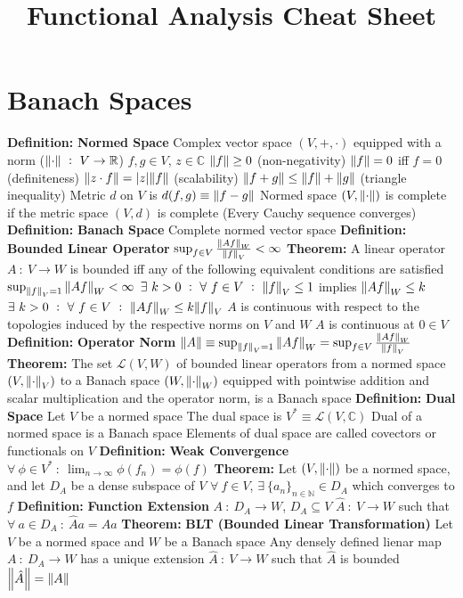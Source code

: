 \documentclass[14pt]{extarticle}
\title{Functional Analysis Cheat Sheet}
\def\Definition{{\color{blue} \textbf{Definition:} }}
\def\Theorem{{\color{red} \textbf{Theorem:} }}
\begin{document}
	\maketitle
	
	\section*{Banach Spaces}
	\begin{outline}		
		\1	\Definition \textbf{Normed Space}
			\2	Complex vector space $(V,+,\cdot)$ equipped with a norm
					($\norm{\cdot}~:~V \rightarrow \mathbb{R}$)
				\3	$f,g \in V$, $z \in \mathbb{C}$	
				\3	$\norm{f} \ge 0$ (non-negativity)
				\3	$\norm{f} = 0$ iff $f = 0$ (definiteness)
				\3	$\norm{z \cdot f} = \abs{z}\norm{f}$ (scalability)
				\3	$\norm{f + g} \le \norm{f} + \norm{g}$ (triangle inequality)
			\2	Metric $d$ on $V$ is $d(f,g) \equiv \norm{f - g}$
			\2	Normed space $(V,\norm{\cdot})$ is complete if the metric space
					$(V,d)$ is complete (Every Cauchy sequence converges)
		\1	\Definition \textbf{Banach Space}
			\2	Complete normed vector space
		\1	\Definition \textbf{Bounded Linear Operator}
			\2	$\sup_{f \in V} \frac{\norm{Af}_W}{\norm{f}_V} < \infty$
		\1	\Theorem A linear operator $A~:~V \rightarrow W$ is bounded iff any of
				the following equivalent conditions are satisfied
			\2	$\sup_{\norm{f}_V = 1}\norm{Af}_W < \infty$
			\2	$\exists~k > 0~:~\forall~f \in V~:~\norm{f}_V \le 1$ implies $\norm{Af}_W \le k$
			\2	$\exists~k > 0~:~\forall~f \in V~:~\norm{Af}_W \le k\norm{f}_V$
			\2	$A$ is continuous with respect to the topologies induced by the
					respective norms on $V$ and $W$
			\2	$A$ is continuous at $0 \in V$
		\1	\Definition \textbf{Operator Norm}
			\2	$\norm{A} \equiv \sup_{\norm{f}_V = 1} \norm{Af}_W = 
					\sup_{f \in V}\frac{\norm{Af}_W}{\norm{f}_V}$
		\1	\Theorem The set $\mathcal{L}(V,W)$ of bounded linear operators from
				a normed space $(V,\norm{\cdot}_V)$ to a Banach space $(W,\norm{\cdot}_W)$
				equipped with pointwise addition and scalar multiplication and the operator
				norm, is a Banach space
		\1	\Definition \textbf{Dual Space}
			\2	Let $V$ be a normed space
			\2	The dual space is $V^* \equiv \mathcal{L}(V,\mathbb{C})$
			\2	Dual of a normed space is a Banach space
			\2	Elements of dual space are called covectors or functionals on $V$
		\1	\Definition \textbf{Weak Convergence}
			\2	$\forall~\phi \in V^*~:~\lim_{n \rightarrow \infty} \phi(f_n) = \phi(f)$
		\1	\Theorem 
			\2	Let $(V,\norm{\cdot})$ be a normed space, and let $D_A$ be a dense
					subspace of $V$
			\2	$\forall~f \in V$, $\exists~\{a_n\}_{n \in \mathbb{N}} \in D_A$ which
					converges to $f$
		\1	\Definition \textbf{Function Extension}
			\2	$A~:~D_A \rightarrow W$, $D_A \subseteq V$
			\2	$\hat{A}~:~V \rightarrow W$ such that
					$\forall~a \in D_A~:~\hat{A}a = Aa$
		\1	\Theorem \textbf{BLT (Bounded Linear Transformation)}
			\2	Let $V$ be a normed space and $W$ be a Banach space
			\2	Any densely defined lienar map $A~:~D_A \rightarrow W$ has a unique
					extension $\hat{A}~:~V \rightarrow W$ such that $\hat{A}$ is bounded
			\2	$\norm{\hat{A}} = \norm{A}$
	

\end{outline}
\end{document}
